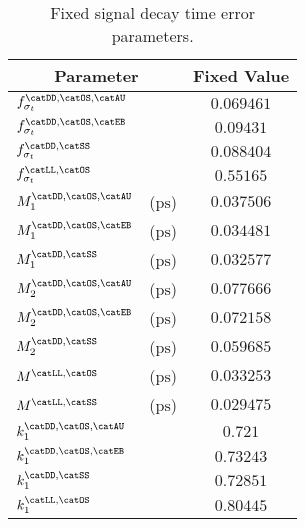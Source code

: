 \begin{table}[h]
\caption{Fixed signal decay time error parameters.}
\label{tab:app:measurement_of_sin2beta:cpv_measurement:fixed_parameters:decay_time_error:sig}
\centering
\begin{tabular}{llr@{$\,\pm\,$}l}
  \toprule
  \multicolumn{2}{c}{Parameter}              & \multicolumn{2}{c}{Fixed Value} \\
  \midrule
  $f_{\sigma_t}^\text{\catDD,\catOS,\catAU}$ &                       & \multicolumn{2}{c}{$0.069461$}\\
  $f_{\sigma_t}^\text{\catDD,\catOS,\catEB}$ &                       & \multicolumn{2}{c}{$0.09431$}\\
  $f_{\sigma_t}^\text{\catDD,\catSS}$        &                       & \multicolumn{2}{c}{$0.088404$}\\
  $f_{\sigma_t}^\text{\catLL,\catOS}$        &                       & \multicolumn{2}{c}{$0.55165$}\\
  $M_1^\text{\catDD,\catOS,\catAU}$          & ($\si{\pico\second}$) & \multicolumn{2}{c}{$0.037506$}\\
  $M_1^\text{\catDD,\catOS,\catEB}$          & ($\si{\pico\second}$) & \multicolumn{2}{c}{$0.034481$}\\
  $M_1^\text{\catDD,\catSS}$                 & ($\si{\pico\second}$) & \multicolumn{2}{c}{$0.032577$}\\
  $M_2^\text{\catDD,\catOS,\catAU}$          & ($\si{\pico\second}$) & \multicolumn{2}{c}{$0.077666$}\\
  $M_2^\text{\catDD,\catOS,\catEB}$          & ($\si{\pico\second}$) & \multicolumn{2}{c}{$0.072158$}\\
  $M_2^\text{\catDD,\catSS}$                 & ($\si{\pico\second}$) & \multicolumn{2}{c}{$0.059685$}\\
  $M^\text{\catLL,\catOS}$                   & ($\si{\pico\second}$) & \multicolumn{2}{c}{$0.033253$}\\
  $M^\text{\catLL,\catSS}$                   & ($\si{\pico\second}$) & \multicolumn{2}{c}{$0.029475$}\\
  $k_1^\text{\catDD,\catOS,\catAU}$          &                       & \multicolumn{2}{c}{$0.721$}\\
  $k_1^\text{\catDD,\catOS,\catEB}$          &                       & \multicolumn{2}{c}{$0.73243$}\\
  $k_1^\text{\catDD,\catSS}$                 &                       & \multicolumn{2}{c}{$0.72851$}\\
  $k_1^\text{\catLL,\catOS}$                 &                       & \multicolumn{2}{c}{$0.80445$}\\

\end{tabular}
\end{table}
